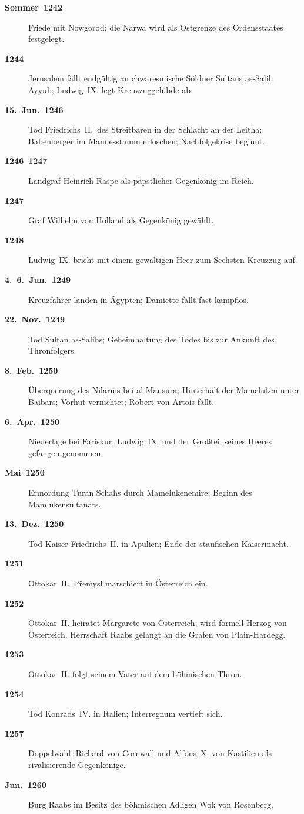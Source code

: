 \begin{description}
  \item[\textbf{Sommer~1242}] Friede mit Nowgorod; die Narwa wird als Ostgrenze des Ordensstaates festgelegt.
  \item[\textbf{1244}] Jerusalem fällt endgültig an chwaresmische Söldner Sultans as-Salih Ayyub; Ludwig~IX. legt Kreuzzuggelübde ab.
  \item[\textbf{15.~Jun.~1246}] Tod Friedrichs~II.~des Streitbaren in der Schlacht an der Leitha; Babenberger im Mannesstamm erloschen; Nachfolgekrise beginnt.
  \item[\textbf{1246--1247}] Landgraf Heinrich Raspe als päpstlicher Gegenkönig im Reich.
  \item[\textbf{1247}] Graf Wilhelm von Holland als Gegenkönig gewählt.
  \item[\textbf{1248}] Ludwig~IX. bricht mit einem gewaltigen Heer zum Sechsten Kreuzzug auf.
  \item[\textbf{4.--6.~Jun.~1249}] Kreuzfahrer landen in Ägypten; Damiette fällt fast kampflos.
  \item[\textbf{22.~Nov.~1249}] Tod Sultan as-Salihs; Geheimhaltung des Todes bis zur Ankunft des Thronfolgers.
  \item[\textbf{8.~Feb.~1250}] Überquerung des Nilarms bei al-Mansura; Hinterhalt der Mameluken unter Baibars; Vorhut vernichtet; Robert von Artois fällt.
  \item[\textbf{6.~Apr.~1250}] Niederlage bei Fariskur; Ludwig~IX. und der Großteil seines Heeres gefangen genommen.
  \item[\textbf{Mai~1250}] Ermordung Turan Schahs durch Mamelukenemire; Beginn des Mamlukensultanats.
  \item[\textbf{13.~Dez.~1250}] Tod Kaiser Friedrichs~II. in Apulien; Ende der staufischen Kaisermacht.
  \item[\textbf{1251}] Ottokar~II.~Přemysl marschiert in Österreich ein.
  \item[\textbf{1252}] Ottokar~II. heiratet Margarete von Österreich; wird formell Herzog von Österreich. Herrschaft Raabs gelangt an die Grafen von Plain-Hardegg.
  \item[\textbf{1253}] Ottokar~II. folgt seinem Vater auf dem böhmischen Thron.
  \item[\textbf{1254}] Tod Konrads~IV. in Italien; Interregnum vertieft sich.
  \item[\textbf{1257}] Doppelwahl: Richard von Cornwall und Alfons~X. von Kastilien als rivalisierende Gegenkönige.
  \item[\textbf{Jun.~1260}] Burg Raabs im Besitz des böhmischen Adligen Wok von Rosenberg.

\end{description}
